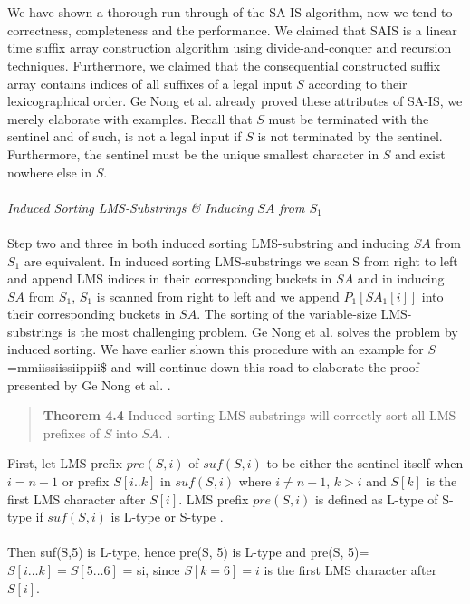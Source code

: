 \documentclass[12pt]{article} %
\begin{document}
\\ \\
We have shown a thorough run-through of the SA-IS algorithm, now we tend to correctness, completeness and the performance. We claimed that SAIS is a linear time suffix array construction algorithm using divide-and-conquer and recursion techniques. Furthermore, we claimed that the consequential constructed suffix array contains indices of all suffixes of a legal input $S$ according to their lexicographical order. Ge Nong et al. \cite{twoeffecient} already proved these attributes of SA-IS, we merely elaborate with examples. Recall that $S$ must be terminated with the sentinel and of such, is not a legal input if $S$ is not terminated by the sentinel. Furthermore, the sentinel must be the unique smallest character in $S$ and exist nowhere else in $S$.  
\\ \\
\textit{Induced Sorting LMS-Substrings \& Inducing $SA$ from $S_1$ }
\\ \\
Step two and three in both induced sorting LMS-substring and inducing $SA$ from $S_1$ are equivalent. In induced sorting LMS-substrings we scan S from right to left and append LMS indices in their corresponding buckets in $SA$ and in inducing $SA$ from $S_1$, $S_1$ is scanned from right to left and we append $P_1[SA_1[i]]$ into their corresponding buckets in $SA$.
The sorting of the variable-size LMS-substrings is the most challenging problem. Ge Nong et al. \cite{twoeffecient} solves the problem by induced sorting. We have earlier shown this procedure with an example for $S$=mmiissiissiippii\$ and will continue down this road to elaborate the proof presented by Ge Nong et al. \cite{twoeffecient}.
\begin{quote}
\textbf{Theorem 4.4} Induced sorting LMS substrings will correctly sort all LMS prefixes of $S$ into $SA$. \cite{twoeffecient}.
\end{quote}
First, let LMS prefix $pre(S, i)$ of $suf(S, i)$ to be either the sentinel itself when $i = n-1$ or prefix $S[i..k]$ in $suf(S, i)$ where $i \neq n-1$, $k > i$ and $S[k]$ is the first LMS character after $S[i]$. LMS prefix $pre(S,i)$ is defined as L-type of S-type if $suf(S, i)$ is L-type or S-type \cite{twoeffecient}.
\\ \\
Then suf(S,5) is L-type, hence pre(S, 5) is L-type and pre(S, 5)=$S[i \ldots k] = S[5 \ldots 6]$ = si, since $S[k=6]=i$ is the first LMS character after $S[i]$. 
\\ \\
\end{document}
